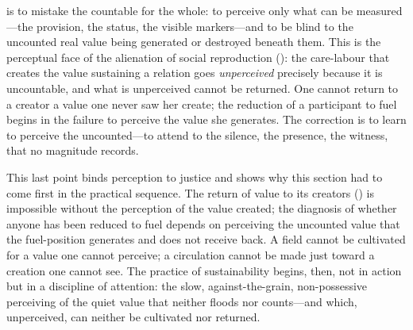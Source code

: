  is to mistake the countable for the whole: to perceive only what can be measured---the provision, the status, the visible markers---and to be blind to the uncounted real value being generated or destroyed beneath them. This is the perceptual face of the alienation of social reproduction (): the care-labour that creates the value sustaining a relation goes \emph{unperceived} precisely because it is uncountable, and what is unperceived cannot be returned.  One cannot return to a creator a value one never saw her create; the reduction of a participant to fuel begins in the failure to perceive the value she generates. The correction is to learn to perceive the uncounted---to attend to the silence, the presence, the witness, that no magnitude records.

This last point binds perception to justice and shows why this section had to come first in the practical sequence. The return of value to its creators () is impossible without the perception of the value created; the diagnosis of whether anyone has been reduced to fuel depends on perceiving the uncounted value that the fuel-position generates and does not receive back.  A field cannot be cultivated for a value one cannot perceive; a circulation cannot be made just toward a creation one cannot see. The practice of sustainability begins, then, not in action but in a discipline of attention: the slow, against-the-grain, non-possessive perceiving of the quiet value that neither floods nor counts---and which, unperceived, can neither be cultivated nor returned.

